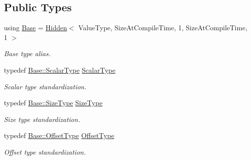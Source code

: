 \subsection*{Public Types}
\begin{DoxyCompactItemize}
\item 
using \hyperlink{classffnn_1_1layer_1_1_activation_a201ec82cc70826c458c1f4dc5e7f3fdf}{Base} = \hyperlink{classffnn_1_1layer_1_1_hidden}{Hidden}$<$ Value\-Type, Size\-At\-Compile\-Time, 1, Size\-At\-Compile\-Time, 1 $>$
\begin{DoxyCompactList}\small\item\em Base type alias. \end{DoxyCompactList}\item 
typedef \hyperlink{classffnn_1_1layer_1_1internal_1_1_interface_a7f834e3365e5199bcbcd16d9abd63941}{Base\-::\-Scalar\-Type} \hyperlink{classffnn_1_1layer_1_1_activation_ad864a6480079601f9723311a686550c3}{Scalar\-Type}
\begin{DoxyCompactList}\small\item\em Scalar type standardization. \end{DoxyCompactList}\item 
typedef \hyperlink{classffnn_1_1layer_1_1_hidden_a3deb1dc4b3a83b3d6749474debee025f}{Base\-::\-Size\-Type} \hyperlink{classffnn_1_1layer_1_1_activation_ab3635bf431b97e8f1b51704f20d60d34}{Size\-Type}
\begin{DoxyCompactList}\small\item\em Size type standardization. \end{DoxyCompactList}\item 
typedef \hyperlink{classffnn_1_1layer_1_1_hidden_a4a191bc002b2545231a3d80c99004693}{Base\-::\-Offset\-Type} \hyperlink{classffnn_1_1layer_1_1_activation_aff203e6e98860cf5887ecc18894619fb}{Offset\-Type}
\begin{DoxyCompactList}\small\item\em Offset type standardization. \end{DoxyCompactList}\end{DoxyCompactItemize}
